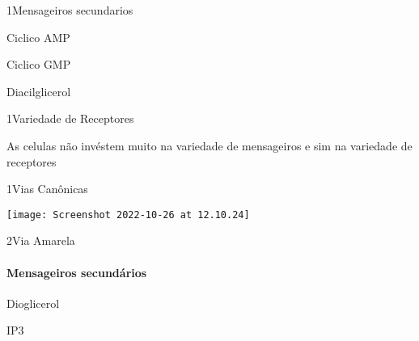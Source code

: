 \documentclass[\mainfilename]{subfiles}
\begin{document}
\begin{sectionBox}1{Mensageiros secundarios} %
    
    \begin{itemize}
        \begin{multicols}{3}
            \item {}
            \item Ciclico AMP
            \item Ciclico GMP
            \item {}
            \item Diacilglicerol
        \end{multicols}
    \end{itemize}
    
\end{sectionBox}

\begin{definitionBox}1{Variedade de Receptores} %
    
    As celulas não invéstem muito na variedade de mensageiros e sim na variedade de receptores
    
\end{definitionBox}

\begin{sectionBox}1{Vias Canônicas} %
    
    \begin{center}
        \texttt{[image: Screenshot 2022-10-26 at 12.10.24]}
    \end{center}

    \begin{sectionBox}2{Via Amarela} %
        
        \paragraph*{Mensageiros secundários}
        \begin{itemize}
            \begin{multicols}{2}
                \item Dioglicerol
                \item IP3
            \end{multicols}
        \end{itemize}
        
    \end{sectionBox}
    
\end{sectionBox}
\end{document}
